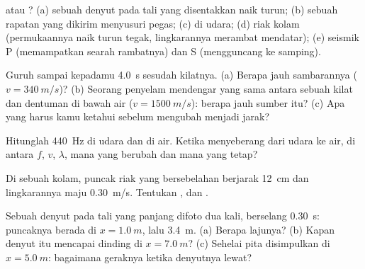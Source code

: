 \begin{exercise}[$\star$]\label{exo:g12:mechanical-waves:2}
 atau ? (a) sebuah denyut pada tali yang
disentakkan naik turun; (b) sebuah rapatan yang dikirim menyusuri pegas;
(c)  di udara; (d) riak kolam (permukaannya naik turun tegak,
lingkarannya merambat mendatar); (e)  seismik P (memampatkan
searah rambatnya) dan  S (mengguncang ke samping).
\end{exercise}

\begin{exercise}[$\star$]\label{exo:g12:mechanical-waves:3}
Guruh sampai kepadamu \qty{4.0}{s} sesudah kilatnya. (a) Berapa jauh
sambarannya ($v = \qty{340}{m/s}$)? (b) Seorang penyelam mendengar  yang sama antara sebuah kilat dan dentuman di bawah air
($v = \qty{1500}{m/s}$): berapa jauh sumber itu? (c) Apa yang harus kamu
ketahui sebelum mengubah  menjadi jarak?
\end{exercise}

\begin{exercise}[$\star$]\label{exo:g12:mechanical-waves:4}
Hitunglah   \qty{440}{Hz} di udara dan di air.
Ketika  menyeberang dari udara ke air, di antara $f$, $v$,
$\lambda$, mana yang berubah dan mana yang tetap?
\end{exercise}

\begin{exercise}[$\star$]\label{exo:g12:mechanical-waves:5}
Di sebuah kolam, puncak riak yang bersebelahan berjarak \qty{12}{cm} dan
lingkarannya maju \qty{0.30}{m/s}. Tentukan , 
dan  .
\end{exercise}

\begin{exercise}[$\star\star$]\label{exo:g12:mechanical-waves:6}
Sebuah denyut pada tali yang panjang difoto dua kali, berselang
\qty{0.30}{s}: puncaknya berada di $x = \qty{1.0}{m}$, lalu
\qty{3.4}{m}. (a) Berapa lajunya? (b) Kapan denyut itu mencapai dinding
di $x = \qty{7.0}{m}$? (c) Sehelai pita disimpulkan di
$x = \qty{5.0}{m}$: bagaimana geraknya ketika denyutnya lewat?
\end{exercise}


